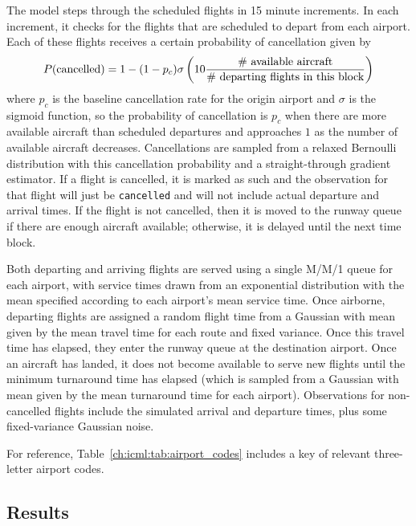 The model steps through the scheduled flights in 15 minute increments. In each increment, it checks for the flights that are scheduled to depart from each airport. Each of these flights receives a certain probability of cancellation given by
\begin{equation}
    P(\text{cancelled}) = 1 - (1 - p_c) \sigma\left( 10 \frac{\text{\# available aircraft}}{\text{\# departing flights in this block}} \right)
\end{equation}
where $p_c$ is the baseline cancellation rate for the origin airport and $\sigma$ is the sigmoid function, so the probability of cancellation is $p_c$ when there are more available aircraft than scheduled departures and approaches $1$ as the number of available aircraft decreases. Cancellations are sampled from a relaxed Bernoulli distribution with this cancellation probability and a straight-through gradient estimator. If a flight is cancelled, it is marked as such and the observation for that flight will just be \texttt{cancelled} and will not include actual departure and arrival times. If the flight is not cancelled, then it is moved to the runway queue if there are enough aircraft available; otherwise, it is delayed until the next time block.

Both departing and arriving flights are served using a single M/M/1 queue for each airport, with service times drawn from an exponential distribution with the mean specified according to each airport's mean service time. Once airborne, departing flights are assigned a random flight time from a Gaussian with mean given by the mean travel time for each route and fixed variance. Once this travel time has elapsed, they enter the runway queue at the destination airport. Once an aircraft has landed, it does not become available to serve new flights until the minimum turnaround time has elapsed (which is sampled from a Gaussian with mean given by the mean turnaround time for each airport). Observations for non-cancelled flights include the simulated arrival and departure times, plus some fixed-variance Gaussian noise.

For reference, Table~\ref{ch:icml:tab:airport_codes} includes a key of relevant three-letter airport codes.



\subsection{Results}

